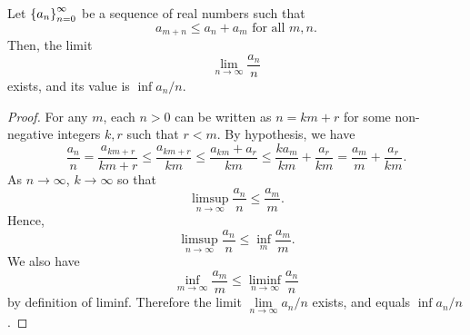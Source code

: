 \documentclass[10pt,twoside,draft]{book}
\begin{document}
\begin{lemma}
  \citep[Theorem 4.9]{walters}
  Let $\left \{ a_n \right \}^{\infty}_{n = 0}$ be a sequence of real numbers such that 
  \begin{equation*}
    a_{m+n} \leq a_n + a_m \mbox{ for all } m,n.
  \end{equation*}
  Then, the limit
  \begin{equation*}
    \lim\limits_{n \to \infty} \frac{a_n}{n} 
  \end{equation*}
  exists, and its value is $\inf a_n / n$.
  \begin{proof}
    For any $m$, each $n > 0$ can be written as $n = km + r$ for some non-negative integers $k,r$ such that $r < m$.
    By hypothesis, we have 
    \begin{equation*}
      \frac{a_n}{n}
      = \frac{a_{km + r}}{km + r}
      \leq \frac{a_{km + r}}{km}
      \leq \frac{a_{km} + a_r}{km}
      \leq \frac{k a_{m}}{km} + \frac{a_r}{km}
      = \frac{a_{m}}{m} + \frac{a_r}{km}.
    \end{equation*}
    As $n \to \infty$, $k \to \infty$ so that
    \begin{equation*}
      \limsup\limits_{n \to \infty} \frac{a_n}{n} \leq \frac{a_m}{m}.
    \end{equation*}
    Hence,
    \begin{equation*}
      \limsup\limits_{n \to \infty} \frac{a_n}{n} \leq \inf\limits_m \frac{a_m}{m}.
    \end{equation*}
    We also have
    \begin{equation*}
      \inf\limits_{m \to \infty} \frac{a_m}{m} \leq \liminf\limits_{n \to \infty} \frac{a_n}{n}
    \end{equation*}
    by definition of liminf.
    Therefore the limit $\lim\limits_{n \to \infty} a_n/n$ exists, and equals $\inf a_n/n$.
  \end{proof}
\end{lemma}
\end{document}
